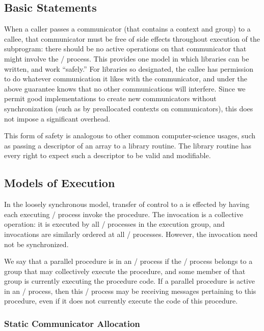 \subsection{Basic Statements}
\label{sec:context:formal-basic}
When a caller passes a communicator (that contains a context and
group) to a callee, that communicator must be free of side effects
throughout execution of the subprogram: there should be no active
operations on that communicator that might involve the \MPI/ process.
This provides one
model in which libraries can be written, and work ``safely.'' For
libraries so designated, the callee has permission to do whatever
communication it likes with the communicator, and under the above
guarantee knows that no other communications will interfere. Since we
permit good implementations to create new communicators without
synchronization (such as by preallocated contexts on communicators),
this does not impose a significant overhead.

This form of safety is analogous to other common computer-science
usages, such as passing a descriptor of an array to a library routine.
The library routine has every right to expect such a descriptor to
be valid and modifiable.

\subsection{Models of Execution}
\label{sec:context:models-of-execution}

In the loosely synchronous model, transfer of control to a
 is effected by having each executing \MPI/ process
invoke the procedure. The invocation is a collective operation: it
is executed by all \MPI/ processes in the execution group, and invocations
are similarly ordered at all \MPI/ processes. However, the invocation need
not be synchronized.

We say that a parallel procedure is  in an \MPI/ process if the \MPI/ process
belongs to a group that may collectively execute the procedure, and
some member of that group is currently executing the procedure code.
If a parallel procedure is active in an \MPI/ process, then this \MPI/ process may
be receiving messages pertaining to this procedure, even if it
does not currently execute the code of this procedure.


\subsubsection{Static Communicator Allocation}
\label{sec:context:static-comm}

